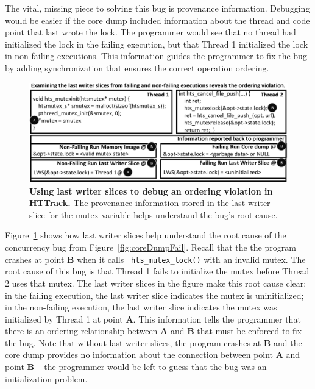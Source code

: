 \documentclass[preprint,9pt]{sigplanconf}
\begin{document}
The vital, missing piece to solving this bug is provenance information.
Debugging would be easier if the core dump included information about the
thread and code point that last wrote the lock.  The programmer would see that
no thread had initialized the lock in the failing execution, but that Thread 1
initialized the lock in non-failing executions.  This information guides the
programmer to fix the bug by adding synchronization that ensures the correct
operation ordering.

\begin{figure}[h]
\centering
\includegraphics[width=\columnwidth]{figs/LWSHTTDebug.pdf}
\caption{\label{fig:httlws}{\bf Using last writer slices to debug an
ordering violation in HTTrack.} The provenance information stored in the last
writer slice for the mutex variable helps understand the bug's root cause.}
\end{figure}

Figure~\ref{fig:httlws} shows how last writer slices help understand the root
cause of the concurrency bug from Figure~\ref{fig:coreDumpFail}.  Recall
that the the program crashes at point {\bf B} when it calls {\tt
hts\_mutex\_lock()} with an invalid mutex.    The root cause of this bug is
that Thread 1 fails to initialize the mutex before Thread 2 uses that mutex.
The last writer slices in the figure make this root cause clear: in the
failing execution, the last writer slice indicates the mutex is uninitialized; in
the non-failing execution, the last writer slice indicates the mutex was 
initialized by Thread 1 at point {\bf A}.  This information tells the
programmer that there is an ordering relationship between {\bf A} and {\bf B}
that must be enforced to fix the bug.  Note that without last writer slices,
the program crashes at {\bf B} and the core dump provides no information about
the connection between point {\bf A} and point {\bf B} -- the programmer would be left to guess that the bug was an initialization problem.
\end{document}
